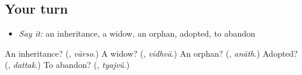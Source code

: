 \subsection*{Your turn}
\begin{itemize}
\raggedright
  \item \emph{Say it:} an inheritance, a widow, an orphan, adopted, to abandon
\end{itemize}

\begin{tcolorbox}[breakable,colback=teal!4,colframe=teal!35!black,title={Before you move on}]
An inheritance? (\textbf{}, \emph{vārso}.) A widow? (\textbf{}, \emph{vidhvā}.) An orphan? (\textbf{}, \emph{anāth}.) Adopted? (\textbf{}, \emph{dattak}.) To abandon? (\textbf{}, \emph{tyajvũ}.)
\end{tcolorbox}
